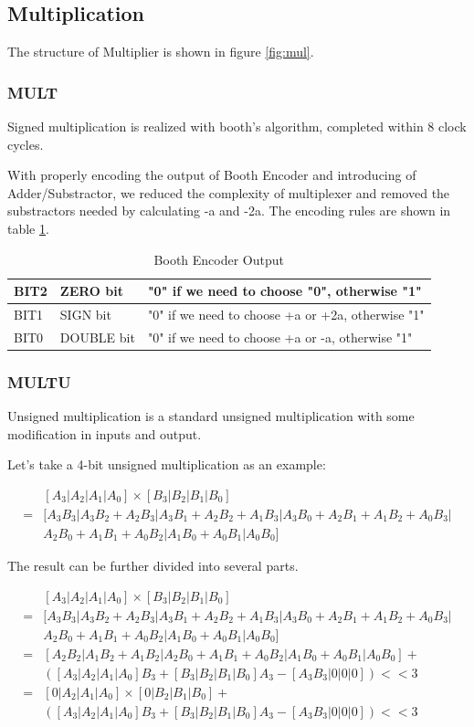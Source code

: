 \subsection[Multiplication]{Multiplication}
The structure of Multiplier is shown in figure \ref{fig:mul}.

\subsubsection[MULT]{MULT}
Signed multiplication is realized with booth's algorithm, completed within 8 clock cycles.

With properly encoding the output of Booth Encoder and introducing of Adder/Substractor,
we reduced the complexity of multiplexer and removed the substractors needed by calculating -a and -2a.
The encoding rules are shown in table \ref{tab:booth_enc}.

\begin{table}[!ht]
\centering
\caption{Booth Encoder Output}
\label{tab:booth_enc}
\begin{tabular}{|l|l|l|}
\hline
BIT2 & ZERO bit & "0" if we need to choose "0", otherwise "1"\\
\hline
BIT1 & SIGN bit & "0" if we need to choose +a or +2a, otherwise "1"\\
\hline
BIT0 & DOUBLE bit & "0" if we need to choose +a or -a, otherwise "1"\\
\hline
\end{tabular}
\end{table}

\subsubsection[MULTU]{MULTU}
Unsigned multiplication is a standard unsigned multiplication with some modification
in inputs and output.

Let's take a 4-bit unsigned multiplication as an example:

\begin{align*}
&[A_3|A_2|A_1|A_0] \times [B_3|B_2|B_1|B_0]\\
=&[A_3B_3|A_3B_2+A_2B_3|A_3B_1+A_2B_2+A_1B_3|A_3B_0+A_2B_1+A_1B_2+A_0B_3|\\
 &A_2B_0+A_1B_1+A_0B_2|A_1B_0+A_0B_1|A_0B_0]
\end{align*}

The result can be further divided into several parts.

\begin{align*}
&[A_3|A_2|A_1|A_0] \times [B_3|B_2|B_1|B_0]\\
=&[A_3B_3|A_3B_2+A_2B_3|A_3B_1+A_2B_2+A_1B_3|A_3B_0+A_2B_1+A_1B_2+A_0B_3|\\
 &A_2B_0+A_1B_1+A_0B_2|A_1B_0+A_0B_1|A_0B_0]\\
=&[A_2B_2|A_1B_2+A_1B_2|A_2B_0+A_1B_1+A_0B_2|A_1B_0+A_0B_1|A_0B_0]+\\
 &([A_3|A_2|A_1|A_0]B_3+[B_3|B_2|B_1|B_0]A_3-[A_3B_3|0|0|0]) << 3\\
=&[0|A_2|A_1|A_0] \times [0|B_2|B_1|B_0]+\\
 &([A_3|A_2|A_1|A_0]B_3+[B_3|B_2|B_1|B_0]A_3-[A_3B_3|0|0|0]) << 3
\end{align*}


